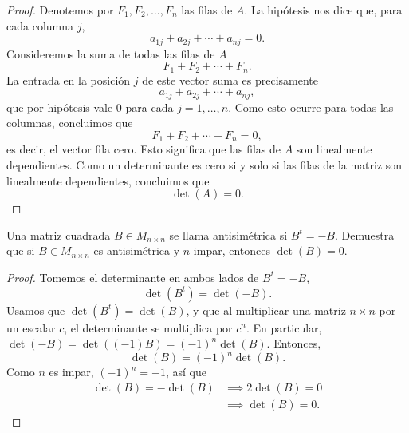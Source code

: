 \documentclass[12pt,a4paper]{article}
\begin{document}
    \begin{proof}
        Denotemos por $F_{1},F_{2},\dots,F_{n}$ las filas de $A$. La hipótesis nos dice que, para cada columna $j$,
        \begin{equation*}
            a_{1j}+a_{2j}+\cdots+a_{nj}=0.
        \end{equation*}
        Consideremos la suma de todas las filas de $A$
        \begin{equation*}
            F_{1}+F_{2}+\cdots+F_{n}.
        \end{equation*}
        La entrada en la posición $j$ de este vector suma es precisamente
        \begin{equation*}
            a_{1j}+a_{2j}+\cdots+a_{nj},
        \end{equation*}
        que por hipótesis vale 0 para cada $j=1,\dots,n$. Como esto ocurre para todas las columnas, concluimos que
        \begin{equation*}
            F_{1}+F_{2}+\cdots+F_{n}=0,
        \end{equation*}
        es decir, el vector fila cero. Esto significa que las filas de $A$ son linealmente dependientes. Como un determinante es cero si y solo si las filas de la matriz son linealmente dependientes, concluimos que
        \begin{equation*}
            \det(A)=0.
        \end{equation*}
    \end{proof}

    \vspace{2cm}

    \begin{problema}
        Una matriz cuadrada $B\in M_{n\times n}$ se llama antisimétrica si $B^{t}=-B$. Demuestra que si $B\in M_{n\times n}$ es antisimétrica y $n$ impar, entonces $\det(B)=0$.
    \end{problema}

    \begin{proof}
        Tomemos el determinante en ambos lados de $B^{t}=-B$,
        \begin{equation*}
            \det(B^{t})=\det(-B).
        \end{equation*}
        Usamos que $\det(B^{t})=\det(B)$, y que al multiplicar una matriz $n\times n$ por un escalar $c$, el determinante se multiplica por $c^{n}$. En particular, $\det(-B)=\det((-1)B)=(-1)^{n}\det(B)$. Entonces,
        \begin{equation*}
            \det(B)=(-1)^{n}\det(B).
        \end{equation*}
        Como $n$ es impar, $(-1)^{n}=-1$, así que
        \begin{align*}
            \det(B)=-\det(B)&\implies 2\det(B)=0\\
            &\implies\det(B)=0.
        \end{align*}
    \end{proof}
\end{document}
